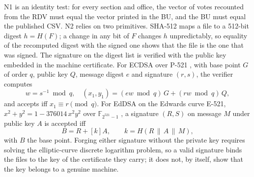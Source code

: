 N1 is an identity test: for every section and office, the vector of votes
recounted from the RDV must equal the vector printed in the BU, and the BU
must equal the published CSV. N2 relies on two primitives. SHA-512
\cite{fips180} maps a file to a 512-bit digest $h=H(F)$; a change in any bit
of $F$ changes $h$ unpredictably, so equality of the recomputed digest with
the signed one shows that the file is the one that was signed. The signature
on the digest list is verified with the public key embedded in the
machine certificate. For ECDSA over P-521 \cite{fips186,johnson2001}, with
base point $G$ of order $q$, public key $Q$, message digest $e$ and signature
$(r,s)$, the verifier computes
\begin{equation}
w=s^{-1}\bmod q,\quad (x_1,y_1)=(ew\bmod q)\,G+(rw\bmod q)\,Q,
\label{eq:ecdsa}
\end{equation}
and accepts iff $x_1\equiv r\pmod q$. For EdDSA \cite{bernstein2012,rfc8032}
on the Edwards curve E-521, $x^2+y^2=1-376014\,x^2y^2$ over
$\mathbb F_{2^{521}-1}$ \cite{aranha2013}, a signature $(R,S)$ on message
$M$ under public key $A$ is accepted iff
\begin{equation}
[S]B=R+[k]A,\qquad k=H(R\,\|\,A\,\|\,M),
\label{eq:eddsa}
\end{equation}
with $B$ the base point. Forging either signature without the private key
requires solving the elliptic-curve discrete logarithm problem, so a valid
signature binds the files to the key of the certificate they carry; it does
not, by itself, show that the key belongs to a genuine machine.
